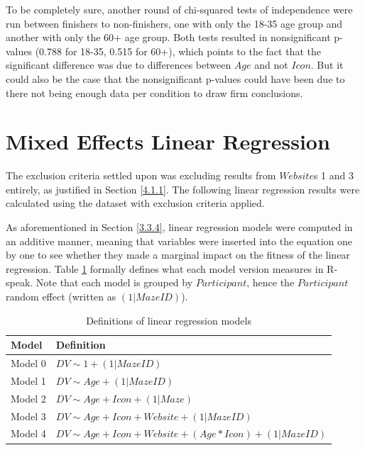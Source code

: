 \documentclass[12pt,twoside]{reedthesis}
\begin{document}
    To be completely sure, another round of chi-squared tests of independence were run between finishers to non-finishers, one with only the 18-35 age group and another with only the 60+ age group. Both tests resulted in nonsignificant p-values (0.788 for 18-35, 0.515 for 60+), which points to the fact that the significant difference was due to differences between $Age$ and not $Icon$. But it could also be the case that the nonsignificant p-values could have been due to there not being enough data per condition to draw firm conclusions.

\section{Mixed Effects Linear Regression}\label{4.2}
    The exclusion criteria settled upon was excluding results from $Website$s 1 and 3 entirely, as justified in Section \ref{4.1.1}. The following linear regression results were calculated using the dataset with exclusion criteria applied. 

    As aforementioned in Section \ref{3.3.4}, linear regression models were computed in an additive manner, meaning that variables were inserted into the equation one by one to see whether they made a marginal impact on the fitness of the linear regression. Table \ref{models} formally defines what each model version measures in R-speak. Note that each model is grouped by $Participant$, hence the $Participant$ random effect (written as $(1 | MazeID)$).
    
    \begin{table}[H]
        \centering
        \begin{tabular}{| p{1.5cm} | p{13cm} |}
            \hline
            Model & Definition\\
            \hline
            Model 0 & $DV\sim1 + (1 | MazeID)$\\
            \hline
            Model 1 & $DV\sim Age + (1 | MazeID)$\\
            \hline
            Model 2 & $DV\sim Age + Icon+(1 | Maze)$\\
            \hline
            Model 3 & $DV\sim Age + Icon + Website+(1 | MazeID)$\\
            \hline
            Model 4 & $DV\sim Age + Icon + Website + (Age * Icon)+(1 | MazeID)$\\
            \hline
        \end{tabular}
        \caption{Definitions of linear regression models}
        \label{models}
    \end{table}
    
\end{document}
